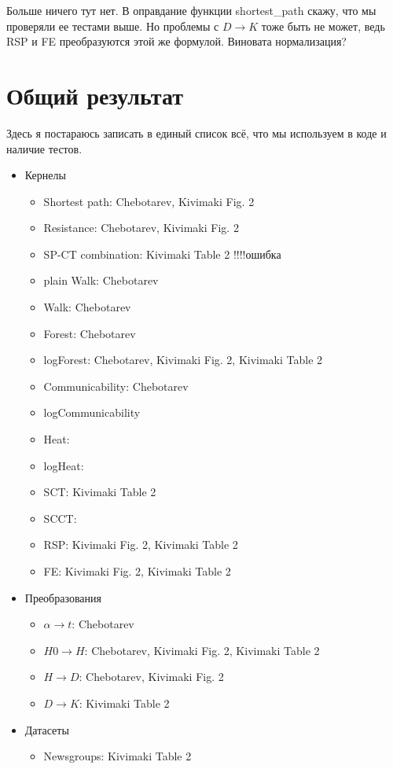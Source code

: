 \documentclass{article}
\begin{document}
Больше ничего тут нет. В оправдание функции shortest\_path скажу, что мы проверяли ее тестами выше. Но проблемы с $D \rightarrow K$ тоже быть не может, ведь RSP и FE преобразуются этой же формулой.
Виновата нормализация?

\section{Общий результат}
Здесь я постараюсь записать в единый список всё, что мы используем в коде и наличие тестов.
\begin{itemize}
  \item Кернелы
  \begin{itemize}
    \item Shortest path: Chebotarev, Kivimaki Fig. 2
    \item Resistance: Chebotarev, Kivimaki Fig. 2
    \item SP-CT combination: Kivimaki Table 2 !!!!ошибка
    \item plain Walk: Chebotarev
    \item Walk: Chebotarev
    \item Forest: Chebotarev
    \item logForest: Chebotarev, Kivimaki Fig. 2, Kivimaki Table 2
    \item Communicability: Chebotarev
    \item logCommunicability
    \item Heat:
    \item logHeat:
    \item SCT: Kivimaki Table 2
    \item SCCT:
    \item RSP: Kivimaki Fig. 2, Kivimaki Table 2
    \item FE: Kivimaki Fig. 2, Kivimaki Table 2
  \end{itemize}
  \item Преобразования
  \begin{itemize}
    \item $\alpha \rightarrow t$: Chebotarev
    \item $H0 \rightarrow H$: Chebotarev, Kivimaki Fig. 2, Kivimaki Table 2 
    \item $H \rightarrow D$: Chebotarev, Kivimaki Fig. 2
    \item $D \rightarrow K$: Kivimaki Table 2
   \end{itemize}
   \item Датасеты
   \begin{itemize}
     \item Newsgroups: Kivimaki Table 2
   \end{itemize}
\end{itemize}
\end{document}
